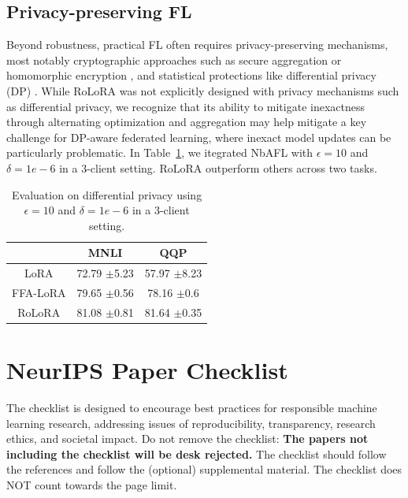 \documentclass{article}
\newcommand{\com}[1]{\tiny$\pm$#1}
\theoremstyle{plain}
\theoremstyle{definition}
\theoremstyle{remark}
\begin{document}
\subsection{ \quad Privacy-preserving FL}
Beyond robustness, practical FL often requires privacy-preserving mechanisms, most notably cryptographic approaches such as secure aggregation \cite{bonawitz2016practical} or homomorphic encryption \cite{hosseini2025secure, 10206955,10619282}, and statistical protections like differential privacy (DP) \cite{el2022differential, wei2019federated}. While RoLoRA was not explicitly designed with privacy mechanisms such as differential privacy, we recognize that its ability to mitigate inexactness through alternating optimization and aggregation may help mitigate a key challenge for DP-aware federated learning, where inexact model updates can be particularly problematic. In Table~\ref{tab:PPFL}, we itegrated NbAFL \cite{wei2019federated} with $\epsilon=10$ and $\delta=1e-6 $ in a 3-client setting. RoLoRA outperform others across two tasks.
\begin{table}[htbp]
    \centering
{\footnotesize
    \begin{tabular}{ccc}
    \toprule
         & MNLI & QQP\\
         \midrule
       LoRA  & 72.79 \com 5.23& 57.97 \com 8.23\\
        FFA-LoRA & 79.65 \com 0.56 & 78.16 \com 0.6\\
        \rowcolor{ours}RoLoRA & 81.08 \com 0.81 & 81.64 \com 0.35\\
         \bottomrule
    \end{tabular}}
    \vspace{4pt}
    \caption{Evaluation on differential privacy using $\epsilon=10$ and $\delta=1e-6 $ in a 3-client setting.}
    \label{tab:PPFL}
\end{table}

\clearpage
\newpage

\section*{NeurIPS Paper Checklist}

The checklist is designed to encourage best practices for responsible machine learning research, addressing issues of reproducibility, transparency, research ethics, and societal impact. Do not remove the checklist: {\bf The papers not including the checklist will be desk rejected.} The checklist should follow the references and follow the (optional) supplemental material.  The checklist does NOT count towards the page
limit. 
\end{document}
